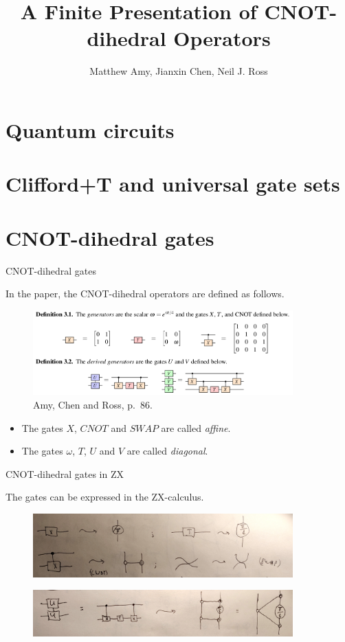 \documentclass{beamer}
\theoremstyle{definition}
\newcommand{\changefont}[3]{\fontfamily{#1} \fontseries{#2} \fontshape{#3} \selectfont}
\begin{document}

\changefont{cmss}{m}{n}
\title{A Finite Presentation of CNOT-dihedral Operators}
\author{Matthew Amy, Jianxin Chen, Neil J. Ross}
\date{}
\frame{\titlepage}



\section{Quantum circuits}
\section{Clifford+T and universal gate sets}

\section{CNOT-dihedral gates}

\begin{frame}{CNOT-dihedral gates}

In the paper, the CNOT-dihedral operators are defined as follows.
\begin{figure}
\includegraphics[width=10cm]{gates}
\centering
\caption{Amy, Chen and Ross, p.~86.}
\end{figure}
\begin{itemize}
\item The gates $X$, $CNOT$ and $SWAP$ are called {\em affine}.
\item The gates $\omega$, $T$, $U$ and $V$ are called {\em diagonal}.
\end{itemize}
\end{frame}

\begin{frame}{CNOT-dihedral gates in ZX}

The gates can be expressed in the ZX-calculus.
\begin{figure}
\includegraphics[width=10cm]{gates-in-ZX}
\centering
\end{figure}
\begin{figure}
\includegraphics[width=10cm]{U-in-ZX}
\centering
\end{figure}
\end{frame}
\end{document}
